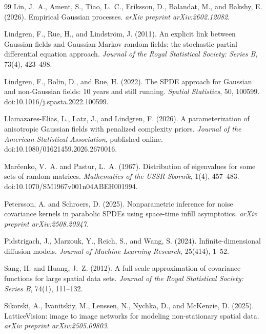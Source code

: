 \documentclass[11pt]{article}
\numberwithin{table}{section}
\numberwithin{figure}{section}
\begin{document}
{\begin{thebibliography}{99}
Lin, J.~A., Ament, S., Tiao, L.~C., Eriksson, D., Balandat, M., and Bakshy, E. (2026).
Empirical Gaussian processes.
\emph{arXiv preprint arXiv:2602.12082}.

Lindgren, F., Rue, H., and Lindstr\"om, J. (2011).
An explicit link between Gaussian fields and Gaussian Markov random fields: the stochastic partial differential equation approach.
\emph{Journal of the Royal Statistical Society: Series B}, 73(4), 423--498.

Lindgren, F., Bolin, D., and Rue, H. (2022).
The SPDE approach for Gaussian and non-Gaussian fields: 10 years and still running.
\emph{Spatial Statistics}, 50, 100599.
doi:10.1016/j.spasta.2022.100599.

Llamazares-Elias, L., Latz, J., and Lindgren, F. (2026).
A parameterization of anisotropic Gaussian fields with penalized complexity priors.
\emph{Journal of the American Statistical Association}, published online.
doi:10.1080/01621459.2026.2670016.

Mar\v{c}enko, V.~A. and Pastur, L.~A. (1967).
Distribution of eigenvalues for some sets of random matrices.
\emph{Mathematics of the USSR-Sbornik}, 1(4), 457--483.
doi:10.1070/SM1967v001n04ABEH001994.

Petersson, A. and Schroers, D. (2025).
Nonparametric inference for noise covariance kernels in parabolic SPDEs using space-time infill asymptotics.
\emph{arXiv preprint arXiv:2508.20947}.

Pidstrigach, J., Marzouk, Y., Reich, S., and Wang, S. (2024).
Infinite-dimensional diffusion models.
\emph{Journal of Machine Learning Research}, 25(414), 1--52.

Sang, H. and Huang, J.~Z. (2012).
A full scale approximation of covariance functions for large spatial data sets.
\emph{Journal of the Royal Statistical Society: Series B}, 74(1), 111--132.

Sikorski, A., Ivanitskiy, M., Lenssen, N., Nychka, D., and McKenzie, D. (2025).
LatticeVision: image to image networks for modeling non-stationary spatial data.
\emph{arXiv preprint arXiv:2505.09803}.


\end{thebibliography}}
\end{document}
